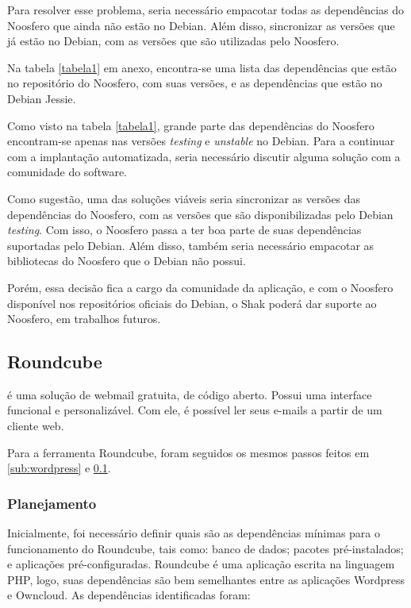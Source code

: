 Para resolver esse problema, seria necessário empacotar todas as dependências
do Noosfero que ainda não estão no Debian. Além disso, sincronizar as versões
que já estão no Debian, com as versões que são utilizadas pelo Noosfero.

Na tabela \ref{tabela1} em anexo, encontra-se uma lista das dependências 
que estão no repositório do Noosfero,
com suas versões, e as dependências que estão no Debian Jessie.

Como visto na tabela \ref{tabela1}, grande parte das dependências do Noosfero encontram-se
 apenas nas versões \textit{testing} e \textit{unstable} no Debian. Para a continuar com
a implantação automatizada, seria necessário discutir alguma solução 
com a comunidade do software. 

Como sugestão, uma das soluções viáveis seria 
sincronizar as versões das dependências do Noosfero, com as versões que são 
disponibilizadas pelo Debian \textit{testing}. Com isso, o 
Noosfero passa a ter boa parte de suas dependências suportadas pelo Debian. Além disso, 
também seria necessário empacotar as bibliotecas do Noosfero que o Debian não possui. 

Porém, essa decisão fica a cargo da comunidade da aplicação, e com o Noosfero disponível
nos repositórios oficiais do Debian, o Shak poderá dar suporte ao Noosfero, 
em trabalhos futuros.

 \subsection{Roundcube}
\label{sub:owncloud}

 é uma solução de webmail gratuita, de código 
aberto. Possui uma interface funcional e personalizável. Com ele, é possível
ler seus e-mails a partir de um cliente web. 

Para a ferramenta Roundcube, foram seguidos os mesmos passos feitos em 
\ref{sub:wordpress} e \ref{sub:owncloud}.

\subsubsection{Planejamento}

Inicialmente, foi necessário definir quais são as dependências
mínimas para o funcionamento do Roundcube, tais como: banco de dados; pacotes
pré-instalados; e aplicações pré-configuradas. Roundcube é uma aplicação escrita
na linguagem PHP, logo, suas dependências são bem semelhantes entre as aplicações
Wordpress e Owncloud. As dependências identificadas foram:

